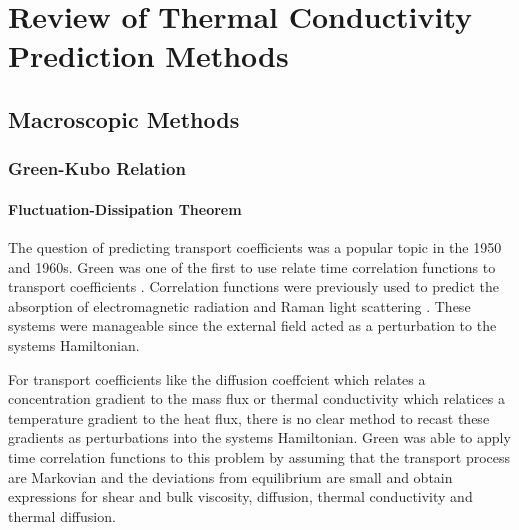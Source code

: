 \chapter{Review of Thermal Conductivity Prediction Methods}


\section{Macroscopic Methods}
\subsection{Green-Kubo Relation}
\subsubsection{Fluctuation-Dissipation Theorem}

The question of predicting transport coefficients was a popular topic in the 1950 and 1960s. Green was one of the first to use relate time correlation functions to transport coefficients \cite{green1954markoff}. Correlation functions were previously used to predict the absorption of electromagnetic radiation \cite{gordon1968correlation} and Raman light scattering \cite{gordon1965molecular}. These systems were manageable since the external field acted as a perturbation to the systems Hamiltonian.

For transport coefficients like the diffusion coeffcient which relates a concentration gradient to the mass flux or thermal conductivity which relatices a temperature gradient to the heat flux, there is no clear method to recast these gradients as perturbations into the systems Hamiltonian\cite {mcquarrie2000statistical}. Green was able to apply time correlation functions to this problem by assuming that the transport process are Markovian and the deviations from equilibrium are small \cite{green1954markoff} and obtain expressions for shear and bulk viscosity, diffusion, thermal conductivity and thermal diffusion.

